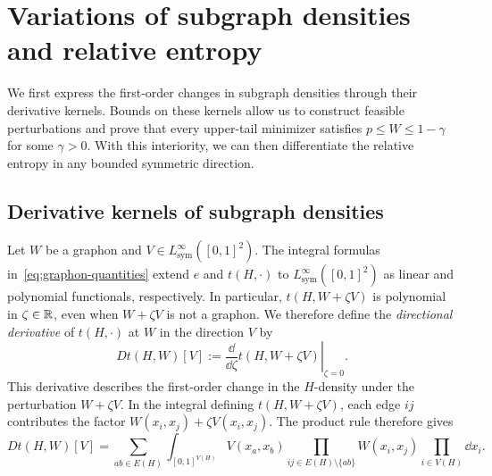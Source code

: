 \section{Variations of subgraph densities and relative entropy}\label{sec:density-variations}

We first express the first-order changes in subgraph densities through
their derivative kernels.  Bounds on these kernels allow us to
construct feasible perturbations and prove that every upper-tail minimizer
satisfies $p\le W\le1-\gamma$ for some $\gamma>0$.  With this interiority,
we can then differentiate the relative entropy in any bounded symmetric direction.

\subsection{Derivative kernels of subgraph densities}\label{sec:derivatives}

Let $W$ be a graphon and $V\in L^\infty_{\mathrm{sym}}([0,1]^2)$.
The integral formulas in~\eqref{eq:graphon-quantities} extend $e$ and
$t(H,\cdot)$ to $L^\infty_{\mathrm{sym}}([0,1]^2)$ as linear and
polynomial functionals, respectively. In particular, $t(H,W+\zeta V)$
is polynomial in $\zeta\in\mathbb R$, even when $W+\zeta V$ is not a graphon.
We therefore define
the \emph{directional derivative} of $t(H,\cdot)$
at $W$ in the direction $V$ by
\[
  Dt(H,W)[V]:=
  \left.\frac{\dd}{\dd\zeta}t(H,W+\zeta V)\right|_{\zeta=0}.
\]
This derivative describes the first-order change in the $H$-density under the
perturbation $W+\zeta V$.  In the integral defining $t(H,W+\zeta V)$,
each edge $ij$ contributes the factor
$W(x_i,x_j)+\zeta V(x_i,x_j)$.  The product rule therefore gives
\[
  Dt(H,W)[V]
  =\sum_{ab\in E(H)}
    \int_{[0,1]^{V(H)}}V(x_a,x_b)
    \prod_{ij\in E(H)\setminus\{ab\}}W(x_i,x_j)
    \prod_{i\in V(H)}\dd x_i.
\]

